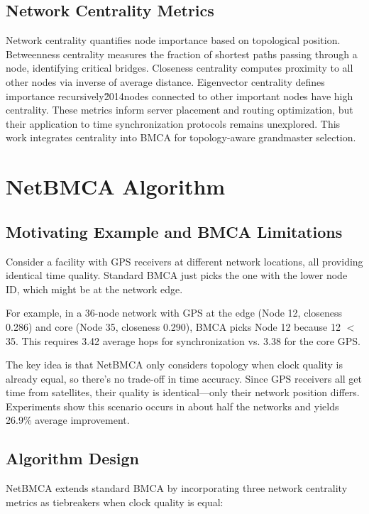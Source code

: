 \documentclass[conference]{IEEEtran}
\begin{document}
\subsection{Network Centrality Metrics}

Network centrality \cite{freeman1978,newman2010} quantifies node importance based on topological position. Betweenness centrality measures the fraction of shortest paths passing through a node, identifying critical bridges. Closeness centrality computes proximity to all other nodes via inverse of average distance. Eigenvector centrality defines importance recursively\u2014nodes connected to other important nodes have high centrality. These metrics inform server placement and routing optimization, but their application to time synchronization protocols remains unexplored. This work integrates centrality into BMCA for topology-aware grandmaster selection.

\section{NetBMCA Algorithm}

\subsection{Motivating Example and BMCA Limitations}

Consider a facility with GPS receivers at different network locations, all providing identical time quality. Standard BMCA just picks the one with the lower node ID, which might be at the network edge.

For example, in a 36-node network with GPS at the edge (Node 12, closeness 0.286) and core (Node 35, closeness 0.290), BMCA picks Node 12 because 12 $<$ 35. This requires 3.42 average hops for synchronization vs. 3.38 for the core GPS.

The key idea is that NetBMCA only considers topology when clock quality is already equal, so there's no trade-off in time accuracy. Since GPS receivers all get time from satellites, their quality is identical---only their network position differs. Experiments show this scenario occurs in about half the networks and yields 26.9\% average improvement.

\subsection{Algorithm Design}

NetBMCA extends standard BMCA by incorporating three network centrality metrics as tiebreakers when clock quality is equal:
\end{document}

